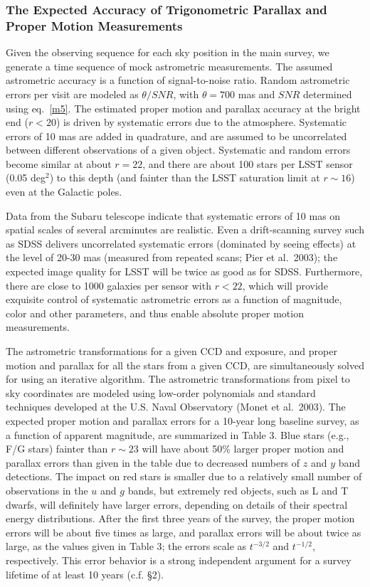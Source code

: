 \documentclass{emulateapj}
\begin{document}
\subsubsection{The Expected Accuracy of Trigonometric Parallax and Proper Motion Measurements } 
\label{sec:astrom}

Given the observing sequence for each sky position in the main survey, we
generate a time sequence of mock astrometric measurements. The assumed astrometric 
accuracy is a function of signal-to-noise ratio. Random astrometric errors per
visit are modeled as $\theta/SNR$, with $\theta=700$ mas and $SNR$ determined using
eq.~\ref{m5}. The estimated proper motion and parallax accuracy at the bright end
($r<20$) is driven by systematic errors due to the atmosphere. Systematic
errors of 10 mas are added in quadrature, and are assumed to be {uncorrelated} 
between different observations of a given object. Systematic and random
errors become similar at about $r=22$, and there are about 100 stars per LSST 
sensor (0.05 deg$^2$) to this depth (and fainter than the LSST saturation limit at
$r\sim16$) even at the Galactic poles. 

Data from the Subaru telescope indicate that systematic errors of 
10 mas on spatial scales of several arcminutes are realistic. Even a drift-scanning 
survey such as SDSS delivers uncorrelated systematic errors (dominated by seeing 
effects) at the level of 20-30 mas (measured from repeated scans; Pier et al.~2003);
the expected image quality for LSST will be twice as good as for SDSS. Furthermore, 
there are close to 1000 galaxies per sensor with $r<22$, which will provide exquisite 
control of systematic astrometric errors as a function of magnitude, color and other 
parameters, and thus enable absolute proper motion measurements.

The astrometric transformations for a given CCD and exposure, and 
proper motion and parallax for all the stars from a given CCD, are simultaneously
solved for using an iterative algorithm. The astrometric transformations from
pixel to sky coordinates are modeled using low-order polynomials and standard
techniques developed at the U.S. Naval Observatory (Monet et al.~2003). The expected 
proper motion and 
parallax errors for a 10-year long baseline survey, as a function of apparent 
magnitude, are summarized in Table 3. Blue stars (e.g., F/G stars) fainter than 
$r\sim23$ will have about 50\% larger proper motion and parallax errors than 
given in the table due to decreased numbers of $z$ and $y$ band detections. The 
impact on red stars is smaller due to a relatively small number of observations 
in the $u$ and $g$ bands, but extremely red objects, such as L and T dwarfs, 
will definitely have larger errors, depending on details of their spectral 
energy distributions.  After the first three years of the survey, 
{the proper motion errors will be about five times as large, and parallax
errors will be about twice as large,} as the values given in Table 3; the errors
scale as $t^{-3/2}$ and $t^{-1/2}$, respectively. This error behavior is 
a strong independent argument for a survey lifetime of at least 10 years 
(c.f. \S 2).  
\end{document}
